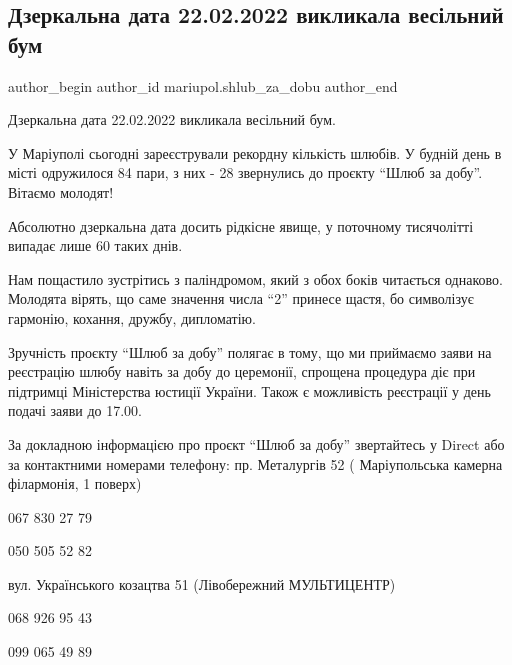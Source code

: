  
 
 
 
 

\subsection{Дзеркальна дата 22.02.2022 викликала весільний бум}
\label{sec:22_02_2022.fb.mariupol.shlub_za_dobu.1.vesilnyj_bum_dzerkalna_data}

\ifcmt
 author_begin
   author_id mariupol.shlub_za_dobu
 author_end
\fi

Дзеркальна дата 22.02.2022 викликала весільний бум.

У Маріуполі сьогодні зареєстрували рекордну кількість шлюбів. У будній день в
місті одружилося 84 пари, з них - 28 звернулись до проєкту \enquote{Шлюб за добу}.
Вітаємо молодят! 

Абсолютно дзеркальна дата досить рідкісне явище, у поточному тисячолітті
випадає лише 60 таких днів.  

Нам пощастило зустрітись з паліндромом, який з обох боків читається однаково.
Молодята вірять, що саме значення числа \enquote{2} принесе щастя, бо символізує
гармонію, кохання, дружбу, дипломатію.  

Зручність проєкту \enquote{Шлюб за добу} полягає в тому, що ми приймаємо заяви на
реєстрацію шлюбу навіть за добу до церемонії, спрощена процедура діє при
підтримці Міністерства юстиції України. Також є можливість реєстрації у день
подачі заяви до 17.00. 

За докладною інформацією про проєкт \enquote{Шлюб за добу} звертайтесь у Direct або за
контактними номерами телефону: пр. Металургів 52 ( Маріупольська камерна
філармонія, 1 поверх)  

067 830 27 79  \par
050 505 52 82  \par
вул. Українського козацтва 51 (Лівобережний МУЛЬТИЦЕНТР)  \par
068 926 95 43  \par
099 065 49 89\par
